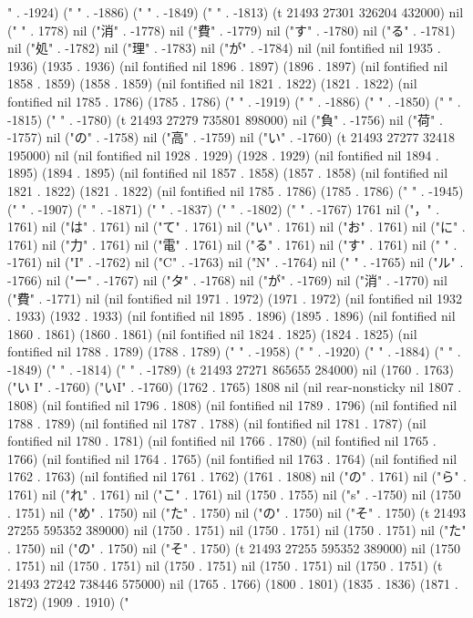 " . -1924) ("
" . -1886) ("
" . -1849) ("
" . -1813) (t 21493 27301 326204 432000) nil ("
" . 1778) nil ("消" . -1778) nil ("費" . -1779) nil ("す" . -1780) nil ("る" . -1781) nil ("処" . -1782) nil ("理" . -1783) nil ("が" . -1784) nil (nil fontified nil 1935 . 1936) (1935 . 1936) (nil fontified nil 1896 . 1897) (1896 . 1897) (nil fontified nil 1858 . 1859) (1858 . 1859) (nil fontified nil 1821 . 1822) (1821 . 1822) (nil fontified nil 1785 . 1786) (1785 . 1786) ("
" . -1919) ("
" . -1886) ("
" . -1850) ("
" . -1815) ("
" . -1780) (t 21493 27279 735801 898000) nil ("負" . -1756) nil ("荷" . -1757) nil ("の" . -1758) nil ("高" . -1759) nil ("い" . -1760) (t 21493 27277 32418 195000) nil (nil fontified nil 1928 . 1929) (1928 . 1929) (nil fontified nil 1894 . 1895) (1894 . 1895) (nil fontified nil 1857 . 1858) (1857 . 1858) (nil fontified nil 1821 . 1822) (1821 . 1822) (nil fontified nil 1785 . 1786) (1785 . 1786) ("
" . -1945) ("
" . -1907) ("
" . -1871) ("
" . -1837) ("
" . -1802) ("
" . -1767) 1761 nil ("，" . 1761) nil ("は" . 1761) nil ("て" . 1761) nil ("い" . 1761) nil ("お" . 1761) nil ("に" . 1761) nil ("力" . 1761) nil ("電" . 1761) nil ("る" . 1761) nil ("す" . 1761) nil (" " . -1761) nil ("I" . -1762) nil ("C" . -1763) nil ("N" . -1764) nil (" " . -1765) nil ("ル" . -1766) nil ("ー" . -1767) nil ("タ" . -1768) nil ("が" . -1769) nil ("消" . -1770) nil ("費" . -1771) nil (nil fontified nil 1971 . 1972) (1971 . 1972) (nil fontified nil 1932 . 1933) (1932 . 1933) (nil fontified nil 1895 . 1896) (1895 . 1896) (nil fontified nil 1860 . 1861) (1860 . 1861) (nil fontified nil 1824 . 1825) (1824 . 1825) (nil fontified nil 1788 . 1789) (1788 . 1789) ("
" . -1958) ("
" . -1920) ("
" . -1884) ("
" . -1849) ("
" . -1814) ("
" . -1789) (t 21493 27271 865655 284000) nil (1760 . 1763) ("い I" . -1760) ("いI" . -1760) (1762 . 1765) 1808 nil (nil rear-nonsticky nil 1807 . 1808) (nil fontified nil 1796 . 1808) (nil fontified nil 1789 . 1796) (nil fontified nil 1788 . 1789) (nil fontified nil 1787 . 1788) (nil fontified nil 1781 . 1787) (nil fontified nil 1780 . 1781) (nil fontified nil 1766 . 1780) (nil fontified nil 1765 . 1766) (nil fontified nil 1764 . 1765) (nil fontified nil 1763 . 1764) (nil fontified nil 1762 . 1763) (nil fontified nil 1761 . 1762) (1761 . 1808) nil ("の" . 1761) nil ("ら" . 1761) nil ("れ" . 1761) nil ("こ" . 1761) nil (1750 . 1755) nil ("s" . -1750) nil (1750 . 1751) nil ("め" . 1750) nil ("た" . 1750) nil ("の" . 1750) nil ("そ" . 1750) (t 21493 27255 595352 389000) nil (1750 . 1751) nil (1750 . 1751) nil (1750 . 1751) nil ("た" . 1750) nil ("の" . 1750) nil ("そ" . 1750) (t 21493 27255 595352 389000) nil (1750 . 1751) nil (1750 . 1751) nil (1750 . 1751) nil (1750 . 1751) nil (1750 . 1751) (t 21493 27242 738446 575000) nil (1765 . 1766) (1800 . 1801) (1835 . 1836) (1871 . 1872) (1909 . 1910) ("
